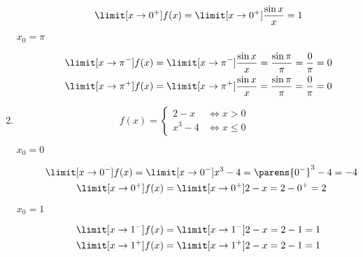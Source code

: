 \begin{enumerate}[label={\alph*)}]
    \item
        \begin{equation*}
            f(x) = \begin{cases}
                2 - x & \iff x > 0\\
                x^3 - 4 & \iff x \leq 0
            \end{cases}
        \end{equation*}
        \begin{description}
            \item[\(x_0 = 0\)]
                \begin{gather*}
                    \limit[x \to 0^-] f(x)
                        = \limit[x \to 0^-] x^3 - 4
                        = \parens{0^-}^3 - 4
                        = -4\\
                    \limit[x \to 0^+] f(x)
                        = \limit[x \to 0^+] 2 - x
                        = 2 - 0^+
                        = 2
                \end{gather*}
            \item[\(x_0 = 1\)]
                \begin{gather*}
                    \limit[x \to 1^-] f(x)
                        = \limit[x \to 1^-] 2 - x
                        = 2 - 1
                        = 1\\
                    \limit[x \to 1^+] f(x)
                        = \limit[x \to 1^+] 2 - x
                        = 2 - 1
                        = 1
                \end{gather*}

\end{description}
\end{enumerate}

